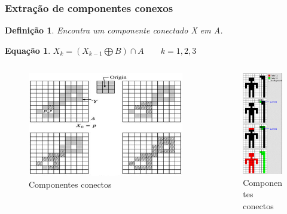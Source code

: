 \documentclass[aspectratio=169]{beamer}
\theoremstyle{Definition}
\newtheorem{defn}{Defini\c c\~ao}
\newtheorem{eq}[theorem]{Equa\c c\~ao}
\begin{document}
\begin{frame}
	\frametitle{Extração de componentes conexos}
	
	\begin{defn}
    	Encontra um componente conectado X em A.
	\end{defn}
	
	\begin{eq}
    	$ X_k = ( X_{k-1} \bigoplus B) \cap A \qquad k = 1, 2, 3$   
	\end{eq}
	
	\begin{columns}
		\begin{column}{0.5\textwidth}
			\begin{figure}[h]
	  		 	\includegraphics[height=0.3\paperheight]{imagens/conecteds}
				\caption{Componentes conectos}\label{figLogical}
			\end{figure}
		\end{column}
		\begin{column}{0.5\textwidth}
			\begin{figure}[h]
			   	\includegraphics[width=4cm, height=0.3\paperheight]{imagens/conecteds2}
				\caption{Componentes conectos}\label{figLogical}
			\end{figure}
		\end{column}
	\end{columns}
	
\end{frame}
\end{document}
